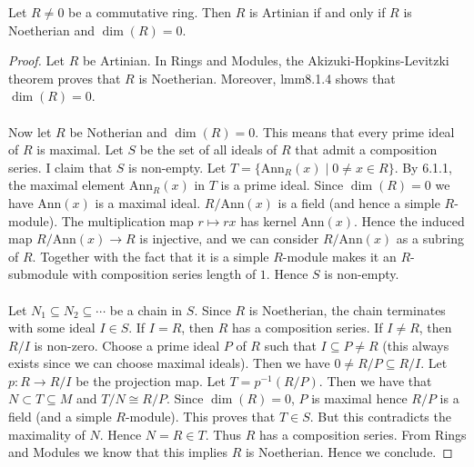 \documentclass[a4paper]{article}
\begin{document}
\begin{prp}{}{} Let $R\neq 0$ be a commutative ring. Then $R$ is Artinian if and only if $R$ is Noetherian and $\dim(R)=0$. \tcbline
\begin{proof}
Let $R$ be Artinian. In Rings and Modules, the Akizuki-Hopkins-Levitzki theorem proves that $R$ is Noetherian. Moreover, lmm8.1.4 shows that $\dim(R)=0$. \\~\\

Now let $R$ be Notherian and $\dim(R)=0$. This means that every prime ideal of $R$ is maximal. Let $S$ be the set of all ideals of $R$ that admit a composition series. I claim that $S$ is non-empty. Let $T=\{\text{Ann}_R(x)\;|\;0\neq x\in R\}$. By 6.1.1, the maximal element $\text{Ann}_R(x)$ in $T$ is a prime ideal. Since $\dim(R)=0$ we have $\text{Ann}(x)$ is a maximal ideal. $R/\text{Ann}(x)$ is a field (and hence a simple $R$-module). The multiplication map $r\mapsto rx$ has kernel $\text{Ann}(x)$. Hence the induced map $R/\text{Ann}(x)\to R$ is injective, and we can consider $R/\text{Ann}(x)$ as a subring of $R$. Together with the fact that it is a simple $R$-module makes it an $R$-submodule with composition series length of $1$. Hence $S$ is non-empty. \\~\\

Let $N_1\subseteq N_2\subseteq\cdots$ be a chain in $S$. Since $R$ is Noetherian, the chain terminates with some ideal $I\in S$. If $I=R$, then $R$ has a composition series. If $I\neq R$, then $R/I$ is non-zero. Choose a prime ideal $P$ of $R$ such that $I\subseteq P\neq R$ (this always exists since we can choose maximal ideals). Then we have $0\neq R/P\subseteq R/I$. Let $p:R\to R/I$ be the projection map. Let $T=p^{-1}(R/P)$. Then we have that $N\subset T\subseteq M$ and $T/N\cong R/P$. Since $\dim(R)=0$, $P$ is maximal hence $R/P$ is a field (and a simple $R$-module). This proves that $T\in S$. But this contradicts the maximality of $N$. Hence $N=R\in T$. Thus $R$ has a composition series. From Rings and Modules we know that this implies $R$ is Noetherian. Hence we conclude. 
\end{proof}
\end{prp}
\end{document}
